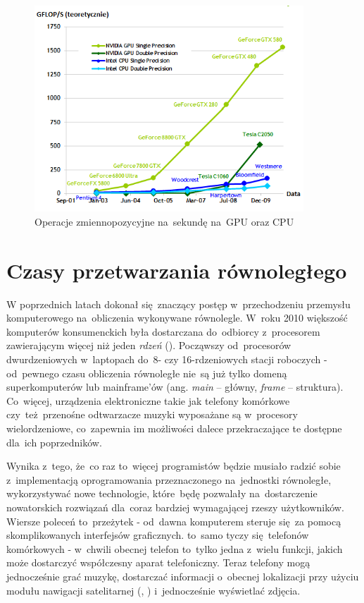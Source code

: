 \begin{figure}[ht]
\centering\includegraphics[width=0.9\textwidth]{figures/03/gpu_cpu2.png}
\caption{Operacje zmiennopozycyjne na~sekundę na~GPU oraz CPU~\cite{Cuda:PGuide}}\label{rys:gpu_cpu2}
\end{figure}

\section{Czasy przetwarzania równoległego}
W poprzednich latach dokonał się~znaczący postęp w~przechodzeniu przemysłu komputerowego na~obliczenia wykonywane równolegle. W~roku 2010 większość komputerów konsumenckich była dostarczana do~odbiorcy z~procesorem zawierającym więcej niż jeden \emph{rdzeń} (). Począwszy od~procesorów dwurdzeniowych w~laptopach do~8- czy 16-rdzeniowych stacji roboczych - od~pewnego czasu obliczenia równoległe nie~są już tylko domeną superkomputerów lub mainframe'ów (ang. \emph{main} – główny, \emph{frame} – struktura). Co~więcej, urządzenia elektroniczne takie jak telefony komórkowe czy~też~przenośne odtwarzacze muzyki wyposażane są w~procesory wielordzeniowe, co~zapewnia im możliwości dalece przekraczające te dostępne dla~ich poprzedników.

Wynika z~tego, że~co raz to~więcej programistów będzie musiało radzić sobie z~implementacją oprogramowania przeznaczonego na~jednostki równoległe, wykorzystywać nowe technologie, które~będę pozwalały na~dostarczenie nowatorskich rozwiązań dla~coraz bardziej wymagającej rzeszy użytkowników. Wiersze poleceń to~przeżytek - od~dawna komputerem steruje się~za pomocą skomplikowanych interfejsów graficznych. to~samo tyczy się~telefonów komórkowych - w~chwili obecnej telefon to~tylko jedna z~wielu funkcji, jakich może dostarczyć współczesny aparat telefoniczny. Teraz telefony mogą jednocześnie grać muzykę, dostarczać informacji o~obecnej lokalizacji przy użyciu modułu nawigacji satelitarnej (, ) i~jednocześnie wyświetlać zdjęcia.

